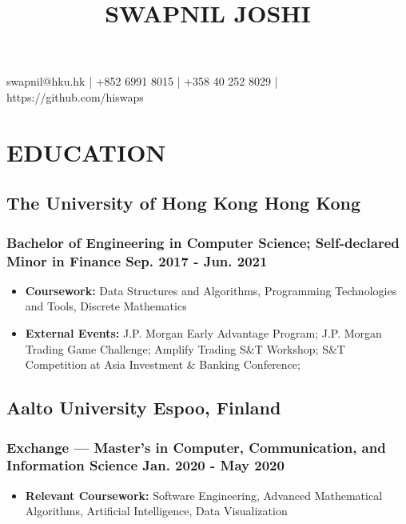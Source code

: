\documentclass{article}
\makeatletter
\renewcommand{\maketitle}{

\begin{center}
{\huge\bfseries
\thetitle}

\vspace*{0.35cm}

swapnil@hku.hk | +852 6991 8015 | +358 40 252 8029 | https://github.com/hiswaps

\end{center}
}
\makeatother
\begin{document}
\title{SWAPNIL JOSHI}
\maketitle





\section{EDUCATION}
\vspace{-1.5mm}
\subsection{The University of Hong Kong \hspace{4.12in} Hong Kong}
\subsubsection{Bachelor of Engineering in Computer Science; Self-declared Minor in Finance \hspace{1.29in} Sep. 2017 - Jun. 2021}
\vspace{-2.9mm}
\begin{itemize}[noitemsep]
\item \textbf{Coursework:} Data Structures and Algorithms, Programming Technologies and Tools, Discrete Mathematics 
\item  \textbf{External Events:} J.P. Morgan Early Advantage Program; J.P. Morgan Trading Game Challenge; Amplify Trading S\&T Workshop; S\&T Competition at Asia Investment \& Banking Conference; 

\end{itemize}

\vspace{-1.6mm}

\subsection{Aalto University \hspace{4.8in} Espoo, Finland}
\subsubsection{Exchange — Master’s in Computer, Communication, and Information Science \hspace{1.29in} Jan. 2020 - May 2020}
\vspace{-2.9mm}
\begin{itemize}[noitemsep]
\item \textbf{Relevant Coursework:} Software Engineering, Advanced Mathematical Algorithms, Artificial Intelligence, Data Visualization
\end{itemize}
\end{document}
